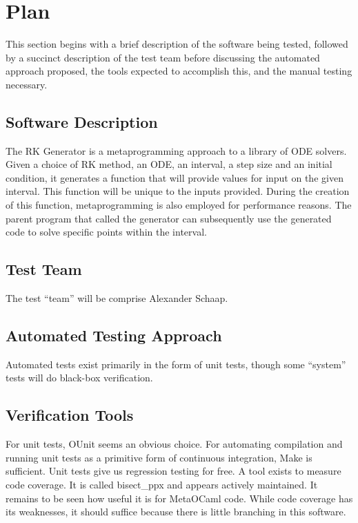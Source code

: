 \documentclass[12pt, titlepage]{article}
\begin{document}
\section{Plan}
This section begins with a brief description of the software being tested, 
followed by a succinct description of the test team before discussing the 
automated approach proposed, the tools expected to accomplish this, and the 
manual testing necessary.

\subsection{Software Description}

The RK Generator is a metaprogramming approach to a library of ODE solvers.
Given a choice of RK method, an ODE, an interval, a step size and an initial 
condition, it generates a function that will provide values for input on the 
given 
interval. This function will be unique to the inputs provided. During the 
creation of this function, metaprogramming is also employed for performance 
reasons.
The parent program that called the generator can subsequently use the generated 
code to solve specific points within the interval.

\subsection{Test Team}

The test ``team'' will be comprise Alexander Schaap.
\subsection{Automated Testing Approach}

Automated tests exist primarily in the form of unit tests, though some 
``system'' tests will do black-box verification.

\subsection{Verification Tools}

For unit tests, OUnit seems an obvious choice. For automating compilation and 
running unit tests as a primitive form of continuous integration, Make is 
sufficient. Unit tests give us regression testing for free. A tool exists to 
measure code coverage. It is called bisect\_ppx and appears actively 
maintained. It remains to be seen how useful it is for MetaOCaml code. While 
code coverage has its weaknesses, it should suffice because there is little 
branching in this software.
\end{document}
